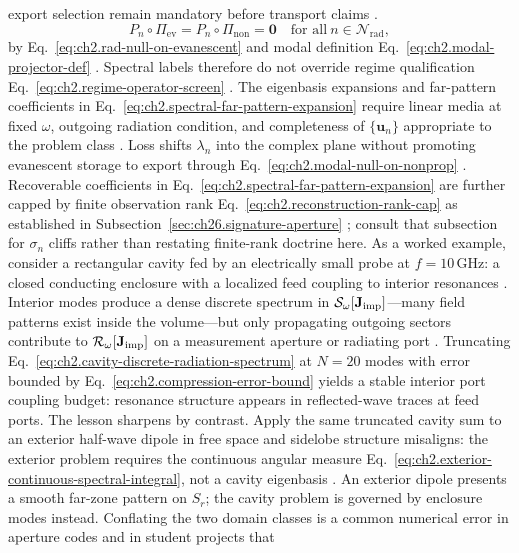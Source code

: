 export selection remain mandatory before transport claims \cite{stratton1941}.
\begin{equation}
\label{eq:ch2.modal-null-on-nonprop}
P_n\circ\Pi_{\mathrm{ev}}=P_n\circ\Pi_{\mathrm{non}}=\mathbf{0}
\quad\text{for all}\ n\in\mathcal{N}_{\mathrm{rad}},
\end{equation}
by Eq.~\eqref{eq:ch2.rad-null-on-evanescent} and modal definition
Eq.~\eqref{eq:ch2.modal-projector-def} \cite{stratton1941}. Spectral labels therefore do not
override regime qualification Eq.~\eqref{eq:ch2.regime-operator-screen}
\cite{harrington2001}.
The eigenbasis expansions and far-pattern coefficients in
Eq.~\eqref{eq:ch2.spectral-far-pattern-expansion} require linear media at fixed \(\omega\),
outgoing radiation condition, and completeness of \(\{\mathbf{u}_n\}\) appropriate to the
problem class \cite{stratton1941}. Loss shifts \(\lambda_n\) into the complex plane without
promoting evanescent storage to export through Eq.~\eqref{eq:ch2.modal-null-on-nonprop}
\cite{stratton1941}. Recoverable coefficients in
Eq.~\eqref{eq:ch2.spectral-far-pattern-expansion} are further capped by finite observation rank
Eq.~\eqref{eq:ch2.reconstruction-rank-cap} as established in Subsection~\ref{sec:ch26.signature-aperture}
\cite{harrington2001}; consult that subsection for $\sigma_n$ cliffs rather than restating
finite-rank doctrine here.
As a worked example, consider a rectangular cavity fed by an electrically small probe at
$f=10\,\mathrm{GHz}$: a closed conducting enclosure with a localized feed coupling to interior
resonances \cite{stratton1941}. Interior modes produce a dense discrete spectrum in
$\mathcal{S}_\omega[\mathbf{J}_{\mathrm{imp}}]$---many field patterns exist inside the volume---but only propagating
outgoing sectors contribute to $\mathcal{R}_\omega[\mathbf{J}_{\mathrm{imp}}]$ on a measurement aperture or radiating
port \cite{stratton1941}. Truncating Eq.~\eqref{eq:ch2.cavity-discrete-radiation-spectrum} at
$N=20$ modes with error bounded by Eq.~\eqref{eq:ch2.compression-error-bound} yields a stable
interior port coupling budget: resonance structure appears in reflected-wave traces at feed ports.
The lesson sharpens by contrast. Apply the same truncated cavity sum to an exterior half-wave
dipole in free space and sidelobe structure misaligns: the exterior problem requires the
continuous angular measure Eq.~\eqref{eq:ch2.exterior-continuous-spectral-integral}, not a cavity
eigenbasis \cite{jackson1999}. An exterior dipole presents a smooth far-zone pattern on $S_r$;
the cavity problem is governed by enclosure modes instead. Conflating the
two domain classes is a common numerical error in aperture codes and in student projects that
